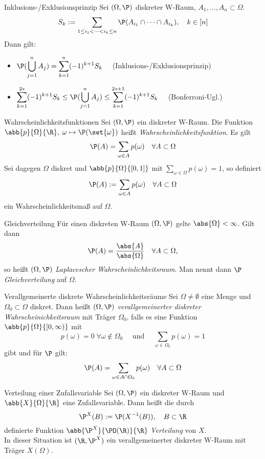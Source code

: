 \begin{karte}{Inklusions-/Exklusionsprinzip}
	Sei $(\Omega,\P)$ diskreter W-Raum, $A_1,\dotsc,A_n \subset \Omega$.
	$$S_k := \sum_{1 \leq i_1 < \dots < i_k \leq n} \P(A_{i_1} \cap \dots \cap A_{i_k}), \quad k \in [n]$$
	Dann gilt:
	\begin{itemize}
		\item $\displaystyle \P(\bigcup_{j=1}^{n} A_j) = \sum_{k=1}^{n} (-1)^{k+1}S_k \quad$ (Inklusions-/Exklusionsprinzip)
		\item $\displaystyle \sum_{k=1}^{2s} (-1)^{k+1}S_k \leq \P(\bigcup_{j=1}^{n} A_j) \leq \sum_{k=1}^{2s+1} (-1)^{k+1}S_k \quad$ (Bonferroni-Ugl.)
	\end{itemize}
\end{karte}

\begin{karte}{Wahrscheinlichkeitsfunktionen}
	Sei $(\Omega, \P)$ ein diskreter W-Raum. Die Funktion $\abb{p}{\Omega}{\R},\; \omega \mapsto \P(\set{\omega})$ heißt \textit{Wahrscheinlichkeitsfunktion}. Es gilt
	$$ \P(A) = \sum_{\omega \in A} p(\omega) \quad \forall A \subset \Omega$$
	Sei dagegen $\Omega$ diskret und $\abb{p}{\Omega}{[0,1]}$ mit $\displaystyle \sum_{\omega \in \Omega} p(\omega) = 1$, so definiert
	$$ \P(A) := \sum_{\omega \in A} p(\omega) \quad \forall A \subset \Omega$$ ein Wahrscheinlichkeitsmaß auf $\Omega$.
\end{karte}

\begin{karte}{Gleichverteilung}
	Für einen diskreten W-Raum $(\Omega,\P)$ gelte $\abs{\Omega} < \infty$. Gilt dann $$\P(A) = \frac{\abs{A}}{\abs{\Omega}} \quad \forall A \subset \Omega \text{,}$$ so heißt $(\Omega,\P)$ \textit{Laplacescher Wahrscheinlichkeitsraum}. Man nennt dann $\P$ \textit{Gleichverteilung} auf $\Omega$.
\end{karte}

\begin{karte}{Verallgemeinerte diskrete Wahrscheinlichkeitsräume}
	Sei $\Omega \neq \emptyset$ eine Menge und $\Omega_0 \subset \Omega$ diskret. Dann heißt $(\Omega,\P)$ \textit{verallgemeinerter diskreter Wahrscheinichkeitsraum} mit Träger $\Omega_0$, falls es eine Funktion $\abb{p}{\Omega}{[0,\infty)}$ mit 
	$$p(\omega)=0 \; \forall \omega \notin \Omega_0 \quad \text{ und } \quad \sum_{\omega \in \Omega_0} p(\omega) =1$$
	gibt und für $\P$ gilt:
	$$\P(A)=\sum_{\omega \in A \cap \Omega_0} p(\omega) \quad \forall A \subset \Omega$$
\end{karte}

\begin{karte}{Verteilung einer Zufallsvariable}
	Sei $(\Omega,\P)$ ein diskreter W-Raum und $\abb{X}{\Omega}{\R}$ eine Zufallsvariable. Dann heißt die durch
	$$\P^X(B):=\P(X^{-1}(B)), \quad B \subset \R$$ definierte Funktion $\abb{\P^X}{\PO(\R)}{\R}$ \textit{Verteilung} von $X$. \\
	In dieser Situation ist $(\R,\P^X)$ ein verallgemeinerter diskreter W-Raum mit Träger $X(\Omega)$.
\end{karte}
